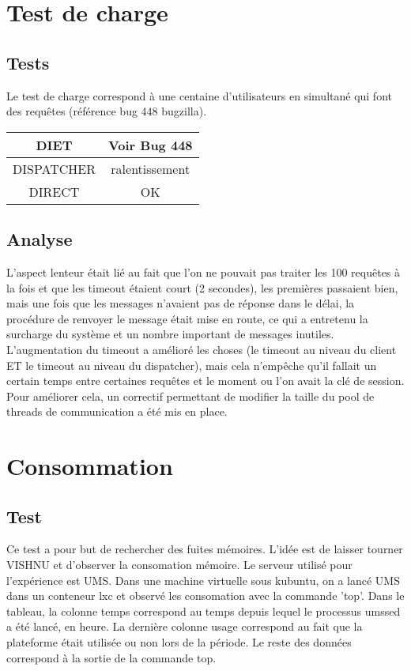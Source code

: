 \documentclass{article}
\begin{document}
\section{Test de charge}
\subsection{Tests}
Le test de charge correspond à une centaine d'utilisateurs en simultané
qui font des requêtes (référence bug 448 bugzilla).

\begin{tabular}{|c|c|}
\hline
DIET & Voir Bug 448 \\
\hline
DISPATCHER & ralentissement \\
\hline
DIRECT & OK \\
\hline
\end{tabular}

\subsection{Analyse}
L'aspect lenteur était lié au fait que l'on ne pouvait pas traiter les 100
requêtes à la fois et que les timeout étaient court (2 secondes), les premières
 passaient bien, mais une fois que les messages n'avaient pas de réponse dans
le délai, la procédure de renvoyer le message était mise en route, ce qui a 
entretenu la surcharge du système et un nombre important de messages inutiles.
L'augmentation du timeout a amélioré les choses (le timeout au niveau du client
ET le timeout au niveau du dispatcher), mais cela n'empêche qu'il fallait un 
certain temps entre certaines requêtes et le moment ou l'on avait la clé de
session. \\
Pour améliorer cela, un correctif permettant de modifier la taille du pool de 
threads de communication a été mis en place.

\section{Consommation}

\subsection{Test}
Ce test a pour but de rechercher des fuites mémoires. L'idée est de laisser
tourner VISHNU et d'observer la consomation mémoire. Le serveur utilisé pour
l'expérience est UMS. Dans une machine virtuelle sous kubuntu, on a lancé
UMS dans un conteneur lxc et observé les consomation avec la commande 'top'. Dans le tableau, la colonne temps correspond au temps depuis lequel 
le processus umssed a été lancé, en heure. La dernière colonne usage 
correspond au fait que la plateforme était utilisée ou non lors de la
période. Le reste des données correspond à la sortie de la commande top.
\end{document}

